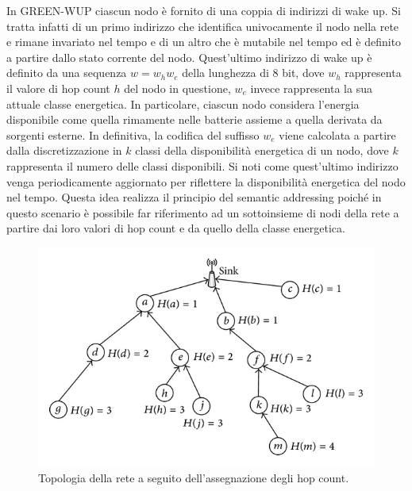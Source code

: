 \documentclass[binding=0.6cm,TFA]{sapthesis}
\begin{document}
In GREEN-WUP ciascun nodo è fornito di una coppia di indirizzi di wake up. Si tratta infatti di un primo indirizzo che identifica univocamente
il nodo nella rete e rimane invariato nel tempo e di un altro che è mutabile nel tempo ed è definito a partire dallo stato corrente del nodo.
Quest'ultimo indirizzo di wake up è definito da una sequenza $w=w_{h}w_{e}$ della lunghezza di 8 bit, dove $w_{h}$ rappresenta il valore di hop
count $h$ del nodo in questione, $w_{e}$ invece rappresenta la sua attuale classe energetica. In particolare, ciascun nodo considera
l'energia disponibile come quella rimamente nelle batterie assieme a quella derivata da sorgenti esterne. In definitiva, la codifica del suffisso
$w_{e}$ viene calcolata a partire dalla discretizzazione in $k$ classi della disponibilità energetica di un nodo, dove $k$ rappresenta il
numero delle classi disponibili. Si noti come quest'ultimo indirizzo venga periodicamente aggiornato per riflettere la disponibilità
energetica del nodo nel tempo. Questa idea realizza il principio del semantic addressing poiché in questo scenario è possibile far riferimento
ad un sottoinsieme di nodi della rete a partire dai loro valori di hop count e da quello della classe energetica. \\

\begin{figure}
    \begin{center}
        \includegraphics[scale=1.7]{hop-count-algorithm.png}
        \caption{Topologia della rete a seguito dell'assegnazione degli hop count.}
    \end{center}
\end{figure}
\end{document}
